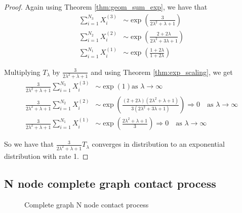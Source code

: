 \documentclass{article}
\theoremstyle{plain}
\theoremstyle{definition}
\theoremstyle{remark}
\begin{document}
\begin{proof}
Again using Theorem \eqref{thm:geom_sum_exp}, we have that
\begin{align*}
    \sum_{i = 1}^{N_3} X_i^{(3)} &\sim \exp\left(
        \frac{3}{2\lambda^2 + \lambda + 1}
        \right) \\
    \sum_{i = 1}^{N_2} X_i^{(2)} &\sim \exp\left(
        \frac{2 + 2\lambda}{2 \lambda^2 + 3\lambda + 1}
    \right)\\
    \sum_{i = 1}^{N_1} X_i^{(1)} &\sim \exp\left(\frac{1 + 2\lambda}{1 + 2\lambda}\right)
\end{align*}

Multiplying $T_\lambda$ by $\frac{3}{2 \lambda^2 + \lambda + 1}$ and using Theorem \eqref{thm:exp_scaling}, we get
\begin{align*}
    \frac{3}{2 \lambda^2 + \lambda + 1} \sum_{i = 1}^{N_3} X_i^{(3)} &\sim \exp\left(
        1
        \right) \text{as } \lambda \to \infty\\
    \frac{3}{2 \lambda^2 + \lambda + 1} \sum_{i = 1}^{N_2} X_i^{(2)} &\sim \exp\left(
        \frac{(2 + 2\lambda)(2 \lambda^2 + \lambda + 1)}{3 (2 \lambda^2 + 3\lambda + 1)}
    \right)  \Rightarrow 0 \quad \text{as } \lambda \to \infty\\
    \frac{3}{2 \lambda^2 + \lambda + 1} \sum_{i = 1}^{N_1} X_i^{(1)} &\sim \exp\left(
    \frac{2 \lambda^2 + \lambda + 1}{3}
    \right) \Rightarrow 0 \quad \text{as } \lambda \to \infty
\end{align*}

So we have that $\frac{3}{2 \lambda^2 + \lambda + 1} T_\lambda$ converges in distribution to an exponential distribution with rate 1.
\end{proof}

\subsection{N node complete graph contact process}

\begin{figure}
    \centering
    \caption{Complete graph N node contact process}
    \label{fig:n_nodes_contact}
\end{figure}
\end{document}
